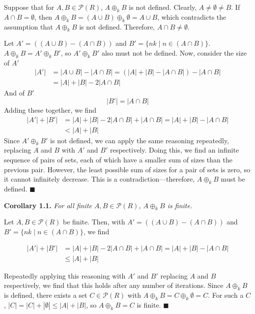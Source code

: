 \documentclass{article}
\newcommand{\abs}[1]{\left|#1\right|}
\begin{document}
Suppose that for $A, B \in \mathcal{P}(R)$, $A \oplus_k B$ is not
defined. Clearly, $A \neq \emptyset \neq B$. If $A \cap B = \emptyset$,
then $A \oplus_k B = (A \cup B) \oplus_k \emptyset = A \cup B$, which
contradicts the assumption that $A \oplus_k B$ is not defined.
Therefore, $A \cap B \neq \emptyset$.

Let $A' = ((A \cup B) - (A \cap B))$ and
$B' = \{nk \mid n \in (A \cap B)\}$. $A \oplus_k B = A' \oplus_k B'$,
so $A' \oplus_k B'$ also must not be defined. Now, consider the size
of $A'$
\[\begin{split}
\abs{A'} &= \abs{A \cup B} - \abs{A \cap B}
= (\abs{A} + \abs{B} - \abs{A \cap B}) - \abs{A \cap B} \\
&= \abs{A} + \abs{B} - 2\abs{A \cap B}
\end{split}\]
And of $B'$
\[\abs{B'} = \abs{A \cap B}\]
Adding these together, we find
\[\begin{split}
\abs{A'} + \abs{B'}
&= \abs{A} + \abs{B} - 2\abs{A \cap B} + \abs{A \cap B}
= \abs{A} + \abs{B} - \abs{A \cap B} \\
&< \abs{A} + \abs{B}
\end{split}\]
Since $A' \oplus_k B'$ is not defined, we can apply the same reasoning
repeatedly, replacing $A$ and $B$ with $A'$ and $B'$ respectively.
Doing this, we find an infinite sequence of pairs of sets, each of
which have a smaller sum of sizes than the previous pair.
However, the least possible sum of sizes for a pair of sets is zero,
so it cannot infinitely decrease. This is a contradiction---therefore,
$A \oplus_k B$ must be defined. $\blacksquare$

\textbf{Corollary 1.1.} \textit{
    For all finite $A, B \in \mathcal{P}(R)$,
    $A \oplus_k B$ is finite.
}

Let $A, B \in \mathcal{P}(R)$ be finite.
Then, with $A' = ((A \cup B) - (A \cap B))$ and
$B' = \{nk \mid n \in (A \cap B)\}$, we find

\[\begin{split}
    \abs{A'} + \abs{B'}
    &= \abs{A} + \abs{B} - 2\abs{A \cap B} + \abs{A \cap B}
    = \abs{A} + \abs{B} - \abs{A \cap B} \\
    &\leq \abs{A} + \abs{B}
\end{split}\]

Repeatedly applying this
reasoning with $A'$ and $B'$ replacing $A$ and $B$ respectively,
we find that this holds after any number of iterations. Since
$A \oplus_k B$ is defined, there exists a set
$C \in \mathcal{P}(R)$ with
$A \oplus_k B = C \oplus_k \emptyset = C$. For such a $C$,
$\abs{C} = \abs{C} + \abs{\emptyset} \leq \abs{A} + \abs{B}$,
so $A \oplus_k B = C$ is finite. $\blacksquare$
\end{document}
